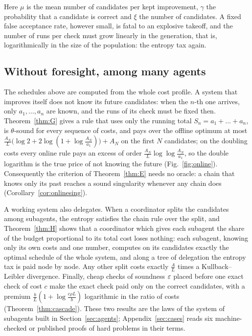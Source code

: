 Here $\mu$ is the mean number of candidates per kept improvement, $\gamma$ the probability that a candidate is correct and $\xi$ the number of candidates. A fixed false acceptance rate, however small, is fatal to an explosive takeoff, and the number of runs per check must grow linearly in the generation, that is, logarithmically in the size of the population: the entropy tax again.

\subsection{Without foresight, among many agents}

The schedules above are computed from the whole cost profile. A system that improves itself does not know its future candidates: when the $n$-th one arrives, only $a_{1},\dots,a_{n}$ are known, and the runs of its check must be fixed then. Theorem~\ref{thm:G} gives a rule that uses only the running total $S_{n}=a_{1}+\dots+a_{n}$, is $\theta$-sound for every sequence of costs, and pays over the offline optimum at most $\frac{A_{N}}{L}\bigl(\log2+2\log(1+\log\frac{A_{N}}{a_{1}})\bigr)+A_{N}$ on the first $N$ candidates; on the doubling costs every online rule pays an excess of order $\frac{A_{N}}{L}\log\log\frac{A_{N}}{a_{1}}$, so the double logarithm is the true price of not knowing the future (Fig.~\ref{fig:online}). Consequently the criterion of Theorem~\ref{thm:E} needs no oracle: a chain that knows only its past reaches a sound singularity whenever any chain does (Corollary~\ref{cor:onlinesing}).

A working system also delegates. When a coordinator splits the candidates among subagents, the entropy satisfies the chain rule over the split, and Theorem~\ref{thm:H} shows that a coordinator which gives each subagent the share of the budget proportional to its total cost loses nothing: each subagent, knowing only its own costs and one number, computes on its candidates exactly the optimal schedule of the whole system, and along a tree of delegation the entropy tax is paid node by node. Any other split costs exactly $\frac AL$ times a Kullback--Leibler divergence. Finally, cheap checks of soundness $\varepsilon$ placed before one exact check of cost $c$ make the exact check paid only on the correct candidates, with a premium $\frac bL(1+\log\frac{c\rho L}{b})$ logarithmic in the ratio of costs (Theorem~\ref{thm:cascade}). These two results are the laws of the system of subagents built in Section~\ref{sec:agents}; Appendix~\ref{sec:cases} reads six machine-checked or published proofs of hard problems in their terms.

